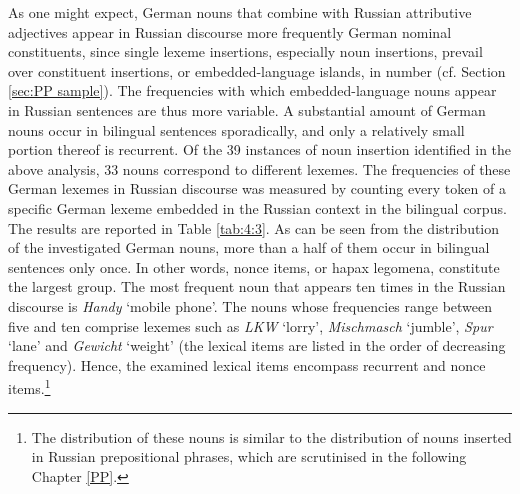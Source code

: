 As one might expect, German nouns that combine with Russian attributive adjectives appear in Russian discourse more frequently German nominal constituents, since single lexeme insertions, especially noun insertions, prevail over constituent insertions, or embedded-language islands, in number (cf. Section \ref{sec:PP sample}). The frequencies with which embedded-language nouns appear in Russian sentences are thus more variable. A substantial amount of German nouns occur in bilingual sentences sporadically, and only a relatively small portion thereof is recurrent. Of the 39 instances of noun insertion identified in the above analysis, 33 nouns correspond to different lexemes. The frequencies of these German lexemes in Russian discourse was measured by counting every token of a specific German lexeme embedded in the Russian context in the bilingual corpus. The results are reported in Table \ref{tab:4:3}. As can be seen from the distribution of the investigated German nouns, more than a half of them occur in bilingual sentences only once. In other words, nonce items, or hapax legomena, constitute the largest group. The most frequent noun that appears ten times in the Russian discourse is \textit{Handy} `mobile phone'. The nouns whose frequencies range between five and ten comprise lexemes such as \textit{LKW} `lorry', \textit{Mischmasch} `jumble', \textit{Spur} `lane' and \textit{Gewicht} `weight' (the lexical items are listed in the order of decreasing frequency). Hence, the examined lexical items encompass recurrent and nonce items.\footnote{The distribution of these nouns is similar to the distribution of nouns inserted in Russian prepositional phrases, which are scrutinised in the following Chapter \ref{PP}.}

